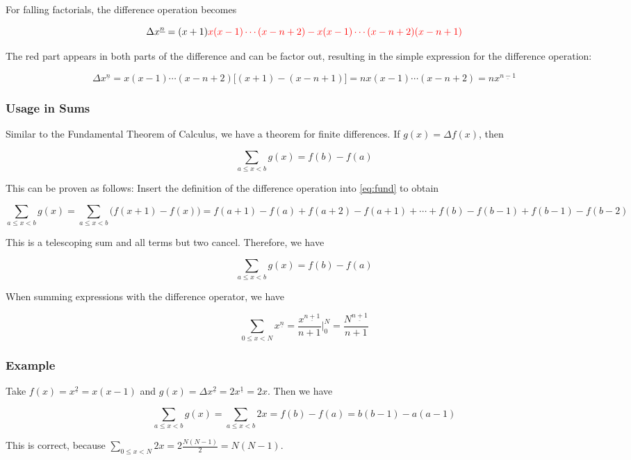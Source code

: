 For falling factorials, the difference operation becomes

\[
\Delta x^{\underline{n}} = (x+1) \color{red}{ x(x-1)\cdots(x-n+2)} - \color{red}{x(x-1)\cdots(x-n+2)} (x-n+1)
\]

The red part appears in both parts of the difference and can be factor out, resulting in the simple expression for the difference operation:

\[
\Delta x^{\underline{n}} = x(x-1)\cdots(x-n+2) \big[ (x+1) - (x-n+1) \big] = n x(x-1)\cdots(x-n+2) = n x^{\underline{n-1}}
\]


\subsubsection{Usage in Sums}

Similar to the Fundamental Theorem of Calculus, we have a theorem for
finite differences. If $g(x) = \Delta f(x)$, then

\begin{equation}
\label{eq:fund}
\sum_{a \leq x < b} g(x) = f(b) - f(a)
\end{equation}

This can be proven as follows: Insert the definition of the difference operation into \eqref{eq:fund} to obtain

\[
\sum_{a \leq x < b} g(x) = \sum_{a \leq x < b} \big( f(x+1) - f(x) \big) = f(a+1) - f(a) + f(a+2) - f(a+1) + \cdots + f(b) - f(b-1) + f(b-1) - f(b-2)
\]

This is a telescoping sum and all terms but two cancel. Therefore, we
have

\[
\sum_{a \leq x < b} g(x) = f(b) - f(a)
\]

When summing expressions with the difference operator, we have

\[
\sum_{0 \leq x < N} x^{\underline{n}} = \frac{x^{\underline{n+1}}}{n+1} \bigg|_0^N = \frac{N^{\underline{n+1}}}{n+1}
\]

\subsubsection{Example}

Take $f(x) = x^{\underline{2}}=x(x-1)$ and $g(x) = \Delta x^{\underline{2}} = 2 x^{\underline{1}} = 2x$. Then we have

\[
\sum_{a \leq x < b} g(x) = \sum_{a \leq x < b} 2x = f(b) - f(a) = b(b-1) - a(a-1)
\]

This is correct, because $\sum_{0 \leq x < N} 2x = 2 \frac{N(N-1)}{2} = N(N-1)$.

